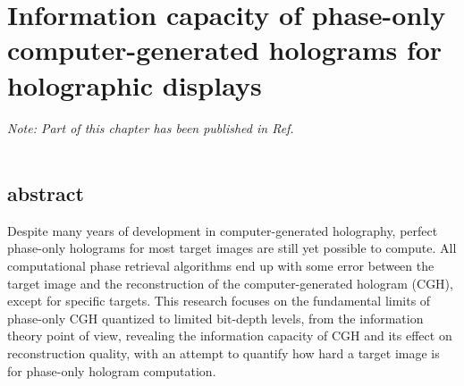 \chapter{Information capacity of phase-only computer-generated holograms for holographic displays}
\label{chapter:information capacity}

\graphicspath{{Chapter_Information_capacity/Figs/}}

\textit{Note: Part of this chapter has been published in Ref. \cite{Sha2024}}\\\\


\section{abstract}
	Despite many years of development in computer-generated holography, perfect phase-only holograms for most target images are still yet possible to compute. All computational phase retrieval algorithms end up with some error between the target image and the reconstruction of the computer-generated hologram (CGH), except for specific targets. This research focuses on the fundamental limits of phase-only CGH quantized to limited bit-depth levels, from the information theory point of view, revealing the information capacity of CGH and its effect on reconstruction quality, with an attempt to quantify how hard a target image is for phase-only hologram computation.



